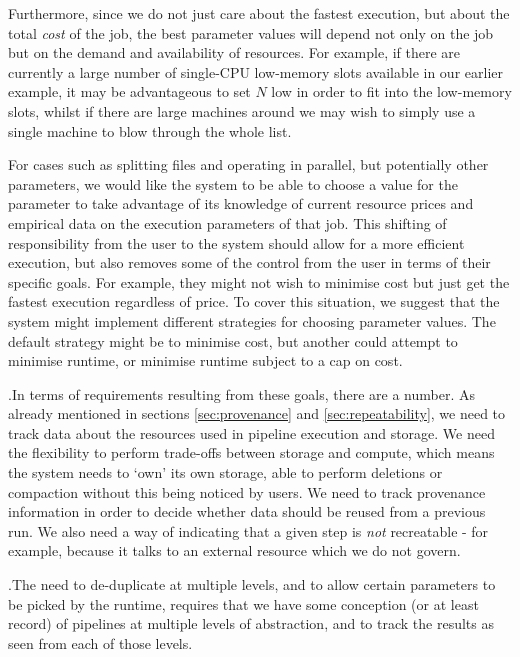 \documentclass[10pt,a4paper]{article}
\newcounter{paracounter}
\newcommand{\npar}{\par\noindent\refstepcounter{paracounter}\theparacounter.\space}
\begin{document}
\begin{enumerate}
Furthermore, since we do not just care about the fastest execution, but about the total \textit{cost} of the job, the best parameter values will depend not only on the job but on the demand and availability of resources. For example, if there are currently a large number of single-CPU low-memory slots available in our earlier example, it may be advantageous to set $N$ low in order to fit into the low-memory slots, whilst if there are large machines around we may wish to simply use a single machine to blow through the whole list.

For cases such as splitting files and operating in parallel, but potentially other parameters, we would like the system to be able to choose a value for the parameter to take advantage of its knowledge of current resource prices and empirical data on the execution parameters of that job. This shifting of responsibility from the user to the system should allow for a more efficient execution, but also removes some of the control from the user in terms of their specific goals. For example, they might not wish to minimise cost but just get the fastest execution regardless of price. To cover this situation, we suggest that the system might implement different strategies for choosing parameter values. The default strategy might be to minimise cost, but another could attempt to minimise runtime, or minimise runtime subject to a cap on cost.
\end{enumerate}
\npar In terms of requirements resulting from these goals, there are a number. As already mentioned in sections \ref{sec:provenance} and \ref{sec:repeatability}, we need to track data about the resources used in pipeline execution and storage. We need the flexibility to perform trade-offs between storage and compute, which means the system needs to `own' its own storage, able to perform deletions or compaction without this being noticed by users. We need to track provenance information in order to decide whether data should be reused from a previous run. We also need a way of indicating that a given step is \textit{not} recreatable - for example, because it talks to an external resource which we do not govern.
\npar The need to de-duplicate at multiple levels, and to allow certain parameters to be picked by the runtime, requires that we have some conception (or at least record) of pipelines at multiple levels of abstraction, and to track the results as seen from each of those levels.
\end{document}

